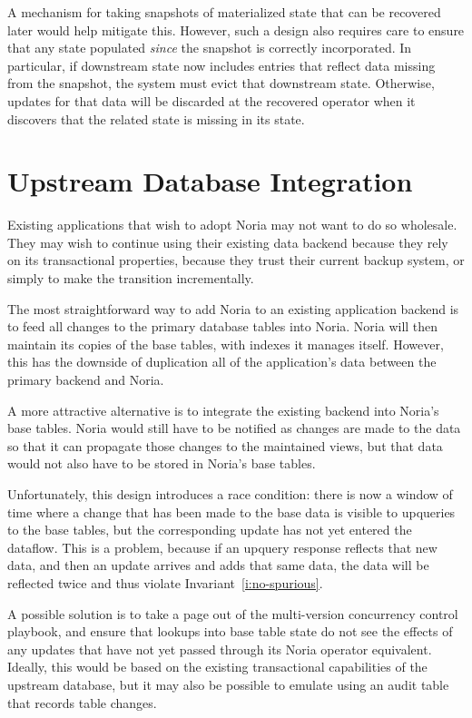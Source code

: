A mechanism for taking snapshots of materialized state that can be recovered
later would help mitigate this. However, such a design also requires care to
ensure that any state populated \emph{since} the snapshot is correctly
incorporated. In particular, if downstream state now includes entries that
reflect data missing from the snapshot, the system must evict that downstream
state. Otherwise, updates for that data will be discarded at the recovered
operator when it discovers that the related state is missing in its state.

\section{Upstream Database Integration}

Existing applications that wish to adopt Noria may not want to do so wholesale.
They may wish to continue using their existing data backend because they rely on
its transactional properties, because they trust their current backup system, or
simply to make the transition incrementally.

The most straightforward way to add Noria to an existing application backend is
to feed all changes to the primary database tables into Noria. Noria will then
maintain its copies of the base tables, with indexes it manages itself. However,
this has the downside of duplication all of the application's data between the
primary backend and Noria.

A more attractive alternative is to integrate the existing backend into Noria's
base tables. Noria would still have to be notified as changes are made to the
data so that it can propagate those changes to the maintained views, but that
data would not also have to be stored in Noria's base tables.

Unfortunately, this design introduces a race condition: there is now a window of
time where a change that has been made to the base data is visible to upqueries
to the base tables, but the corresponding update has not yet entered the
dataflow. This is a problem, because if an upquery response reflects that new
data, and then an update arrives and adds that same data, the data will be
reflected twice and thus violate Invariant~\ref{i:no-spurious}.

A possible solution is to take a page out of the multi-version concurrency
control playbook, and ensure that lookups into base table state do not see the
effects of any updates that have not yet passed through its Noria operator
equivalent. Ideally, this would be based on the existing transactional
capabilities of the upstream database, but it may also be possible to emulate
using an audit table that records table changes.

